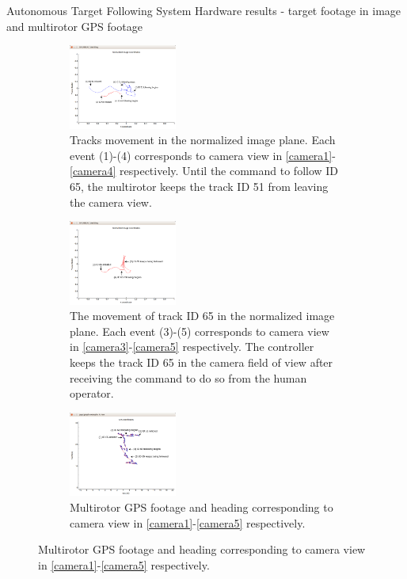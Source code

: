 \documentclass[9pt]{beamer}
\newenvironment{figure*}%
{\begin{figure}}
{\end{figure}}
\begin{document}
\begin{frame}{Autonomous Target Following System}
Hardware results - target footage in image and multirotor GPS footage
\begin{figure}[htbp]
	\centering
	\begin{subfigure}{0.32\textwidth}
		\centering
		\includegraphics[width=1.4in]{chapter3/ID65_follow_begin_annotated.png}
		\caption{Tracks movement in the normalized image plane. Each event (1)-(4) corresponds to camera view in \ref{camera1}-\ref{camera4} respectively. Until the command to follow ID 65, the multirotor keeps the track ID 51 from leaving the camera view.}
	\end{subfigure}%
	\begin{subfigure}{0.32\textwidth}
		\centering
		\includegraphics[width=1.4in]{chapter3/ID65_trace_annotated.png}
		\caption{The movement of track ID 65 in the normalized image plane. Each event (3)-(5) corresponds to camera view in \ref{camera3}-\ref{camera5} respectively. The controller keeps the track ID 65 in the camera field of view after receiving the command to do so from the human operator.}
	\end{subfigure}
	\begin{subfigure}{0.32\textwidth}
		\centering
		\includegraphics[width=1.4in]{chapter3/GPS_trace.png}
		\caption{Multirotor GPS footage and heading corresponding to camera view in \ref{camera1}-\ref{camera5} respectively.}
	\end{subfigure}	
\end{figure}	
\end{frame}
\end{document}
